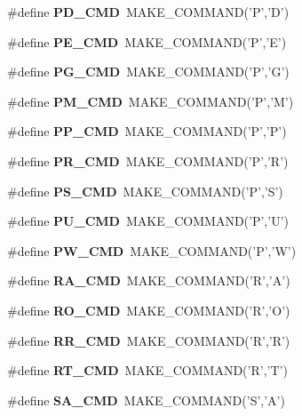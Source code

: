 \begin{CompactItemize}
\item 
\#define \textbf{PD\_\-CMD}~MAKE\_\-COMMAND('P','D')\label{hpgsreader_8h_80eea1f2d09c86c872c653954e4938a7}

\item 
\#define \textbf{PE\_\-CMD}~MAKE\_\-COMMAND('P','E')\label{hpgsreader_8h_0a538e2c30620231a95370799cd4ab4b}

\item 
\#define \textbf{PG\_\-CMD}~MAKE\_\-COMMAND('P','G')\label{hpgsreader_8h_102e68acd6bb5dff13c825c0e101a2f3}

\item 
\#define \textbf{PM\_\-CMD}~MAKE\_\-COMMAND('P','M')\label{hpgsreader_8h_95fcd2cfa1a40a390a5bfd826d26ac25}

\item 
\#define \textbf{PP\_\-CMD}~MAKE\_\-COMMAND('P','P')\label{hpgsreader_8h_2ebc61f0172c255c1464ed7c06ced098}

\item 
\#define \textbf{PR\_\-CMD}~MAKE\_\-COMMAND('P','R')\label{hpgsreader_8h_137f6a61101d5af0e0dba26cf3294612}

\item 
\#define \textbf{PS\_\-CMD}~MAKE\_\-COMMAND('P','S')\label{hpgsreader_8h_2d4f3a70b40cf9ead0003ca419fd126a}

\item 
\#define \textbf{PU\_\-CMD}~MAKE\_\-COMMAND('P','U')\label{hpgsreader_8h_97b148aa6ce573869dc6da7ffc1ecfa3}

\item 
\#define \textbf{PW\_\-CMD}~MAKE\_\-COMMAND('P','W')\label{hpgsreader_8h_253009341e396cb3a0493b421062ebbc}

\item 
\#define \textbf{RA\_\-CMD}~MAKE\_\-COMMAND('R','A')\label{hpgsreader_8h_2d8f0924de536036e8877a98f29c3eb1}

\item 
\#define \textbf{RO\_\-CMD}~MAKE\_\-COMMAND('R','O')\label{hpgsreader_8h_a22584e5191b9ab756f5132ab9f40456}

\item 
\#define \textbf{RR\_\-CMD}~MAKE\_\-COMMAND('R','R')\label{hpgsreader_8h_dec0cb8774ef6940e9ef34954096d27b}

\item 
\#define \textbf{RT\_\-CMD}~MAKE\_\-COMMAND('R','T')\label{hpgsreader_8h_43b6a795fcb6f9acfac38611905d16f6}

\item 
\#define \textbf{SA\_\-CMD}~MAKE\_\-COMMAND('S','A')\label{hpgsreader_8h_94c09df58c465f0e6f2e7d0095a7528a}


\end{CompactItemize}
